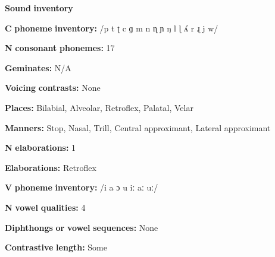 \documentclass[output=paper]{langsci/langscibook}
\begin{document}
\begin{styleBody}
\textbf{Sound} \textbf{inventory}
\end{styleBody}

\begin{styleBody}
\textbf{C} \textbf{phoneme} \textbf{inventory:} /p t ʈ c ɡ m n ɳ ɲ ŋ l ɭ ʎ r ɻ j w/
\end{styleBody}

\begin{styleBody}
\textbf{N} \textbf{consonant} \textbf{phonemes:} 17
\end{styleBody}

\begin{styleBody}
\textbf{Geminates:} N/A
\end{styleBody}

\begin{styleBody}
\textbf{Voicing} \textbf{contrasts:} None
\end{styleBody}

\begin{styleBody}
\textbf{Places:} Bilabial, Alveolar, Retroflex, Palatal, Velar
\end{styleBody}

\begin{styleBody}
\textbf{Manners:} Stop, Nasal, Trill, Central approximant, Lateral approximant
\end{styleBody}

\begin{styleBody}
\textbf{N} \textbf{elaborations:} 1
\end{styleBody}

\begin{styleBody}
\textbf{Elaborations:} Retroflex
\end{styleBody}

\begin{styleBody}
\textbf{V} \textbf{phoneme} \textbf{inventory:} /i a ɔ u iː aː uː/
\end{styleBody}

\begin{styleBody}
\textbf{N} \textbf{vowel} \textbf{qualities:} 4
\end{styleBody}

\begin{styleBody}
\textbf{Diphthongs} \textbf{or} \textbf{vowel} \textbf{sequences:} None
\end{styleBody}

\begin{styleBody}
\textbf{Contrastive} \textbf{length:} Some
\end{styleBody}
\end{document}
